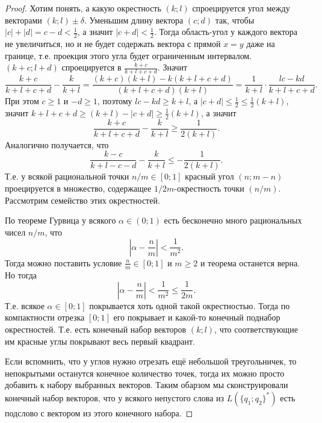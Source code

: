 \documentclass[12pt,a4paper]{article}
\begin{document}
\begin{problem}{8}
\begin{enumerate}
\begin{proof}
                    Хотим понять, а какую окрестность $(k; l)$ спроецируется угол между векторами $(k; l) \pm \delta$. Уменьшим длину вектора $(c; d)$ так, чтобы $|c| + |d| = c-d < \frac{1}{2}$, а значит $|c + d| < \frac{1}{2}$. Тогда область-угол у каждого вектора не увеличиться, но и не будет содержать вектора с прямой $x=y$ даже на границе, т.е. проекция этого угла будет ограниченным интервалом. $(k + c; l + d)$ спроецируется в $\frac{k+c}{k+l+c+d}$. Значит
                    \[
                        \frac{k+c}{k+l+c+d} - \frac{k}{k+l}
                        = \frac{(k+c)(k+l) - k(k+l+c+d)}{(k+l+c+d)(k+l)}
                        = \frac{1}{k+l} \cdot \frac{lc - kd}{k+l+c+d}.
                    \]
                    При этом $c \geqslant 1$ и $-d \geqslant 1$, поэтому $lc - kd \geqslant k+l$, а $|c+d| \leqslant \frac{1}{2} \leqslant \frac{1}{2}(k+l)$, значит $k+l+c+d \geqslant (k+l) - |c+d| \geqslant \frac{1}{2}(k+l)$, а значит
                    \[\frac{k+c}{k+l+c+d} - \frac{k}{k+l} \geqslant \frac{1}{2(k+l)}.\]
                    Аналогично получается, что
                    \[\frac{k-c}{k+l-c-d} - \frac{k}{k+l} \leqslant -\frac{1}{2(k+l)}.\]
                    Т.е. у всякой рациональной точки $n/m \in [0; 1]$ красный угол $(n; m-n)$ проецируется в множество, содержащее $1/2m$-окрестность точки $(n/m)$. Рассмотрим семейство этих окрестностей.

                    По теореме Гурвица у всякого $\alpha \in (0; 1)$ есть бесконечно много рациональных чисел $n/m$, что
                    \[
                        \left|\alpha - \frac{n}{m}\right| < \frac{1}{m^2}.
                    \]
                    Тогда можно поставить условие $\frac{n}{m} \in [0; 1]$ и $m \geqslant 2$ и теорема останется верна. Но тогда
                    \[
                        \left|\alpha - \frac{n}{m}\right| < \frac{1}{m^2} \leqslant \frac{1}{2m}.
                    \]
                    Т.е. всякое $\alpha \in [0; 1]$ покрывается хоть одной такой окрестностью. Тогда по компактности отрезка $[0; 1]$ его покрывает и какой-то конечный поднабор окрестностей. Т.е. есть конечный набор векторов $(k; l)$, что соответствующие им красные углы покрывают весь первый квадрант.

                    Если вспомнить, что у углов нужно отрезать ещё небольшой треугольничек, то непокрытыми останутся конечное количество точек, тогда их можно просто добавить к набору выбранных векторов. Таким обарзом мы сконструировали конечный набор векторов, что у всякого непустого слова из $L(\{q_1; q_2\}^*)$ есть подслово с вектором из этого конечного набора.


\end{proof}
\end{enumerate}
\end{problem}
\end{document}
